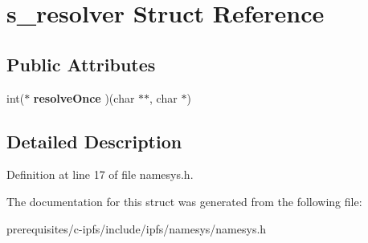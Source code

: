 \hypertarget{structs__resolver}{}\section{s\+\_\+resolver Struct Reference}
\label{structs__resolver}
\subsection*{Public Attributes}
\begin{DoxyCompactItemize}
\item 
\mbox{\label{structs__resolver_a298616cdd771937a16e29c6a6651a6ee}} 
int($\ast$ {\bfseries resolve\+Once} )(char $\ast$$\ast$, char $\ast$)
\end{DoxyCompactItemize}


\subsection{Detailed Description}


Definition at line 17 of file namesys.\+h.



The documentation for this struct was generated from the following file\+:\begin{DoxyCompactItemize}
\item 
prerequisites/c-\/ipfs/include/ipfs/namesys/namesys.\+h\end{DoxyCompactItemize}
